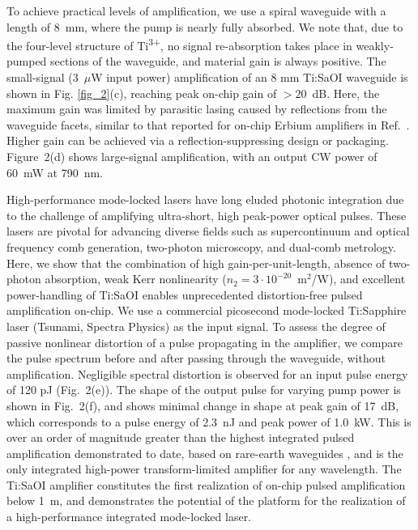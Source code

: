 \documentclass[amsmath, amsthm, amssymb, aps, prb, superscriptaddress, twocolumn, nofootinbib, 10pt]{revtex4-1}%
\begin{document}
To achieve practical levels of amplification, we use a spiral waveguide with a length of 8~mm, where the pump is nearly fully absorbed. We note that, due to the four-level structure of Ti\textsuperscript{3+}, no signal re-absorption takes place in weakly-pumped sections of the waveguide, and material gain is always positive. The small-signal (3~$\mu$W input power) amplification of an 8 mm Ti:SaOI waveguide is shown in Fig. \ref{fig_2}(c), reaching peak on-chip gain of $>20$~dB. Here, the maximum gain was limited by parasitic lasing caused by reflections from the waveguide facets, similar to that reported for on-chip Erbium amplifiers in Ref.~\cite{liu2022photonic}. 
Higher gain can be achieved via a reflection-suppressing design or packaging. Figure~2(d) shows large-signal amplification, with an output CW power of 60~mW at 790~nm.

% 
High-performance mode-locked lasers have long eluded photonic integration due to the challenge of amplifying ultra-short, high peak-power optical pulses. These lasers are pivotal for advancing diverse fields such as supercontinuum and optical frequency comb generation\cite{holzwarth2000optical}, two-photon microscopy\cite{helmchen2005deep}, and dual-comb metrology\cite{ideguchi2013coherent}. Here, we show that the combination of high gain-per-unit-length, absence of two-photon absorption, weak Kerr nonlinearity ($n_2 = 3\cdot10^{-20}$~m$^2$/W)\cite{major2004dispersion}, and excellent power-handling of Ti:SaOI enables unprecedented distortion-free pulsed amplification on-chip.  We use a commercial picosecond mode-locked Ti:Sapphire laser (Tsunami, Spectra Physics) as the input signal. To assess the degree of passive nonlinear distortion of a pulse propagating in the amplifier, we compare the pulse spectrum before and after passing through the waveguide, without amplification. Negligible spectral distortion is observed for an input pulse energy of 120 pJ (Fig.~2(e)). The shape of the output pulse for varying pump power is shown in Fig.~2(f), and shows minimal change in shape at peak gain of 17~dB, which corresponds to a pulse energy of 2.3~nJ and peak power of 1.0~kW. This is over an order of magnitude greater than the highest integrated pulsed amplification demonstrated to date, based on rare-earth waveguides \cite{liu2022photonic,shtyrkova2019integrated, byun2009integrated}, and is the only integrated high-power transform-limited amplifier for any wavelength. The Ti:SaOI amplifier constitutes the first realization of on-chip pulsed amplification below 1~\textmu m, and demonstrates the potential of the platform for the realization of a high-performance integrated mode-locked laser.
\end{document}
